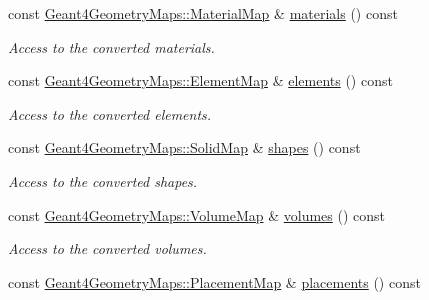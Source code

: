 \begin{DoxyCompactItemize}
\item 
const \hyperlink{namespace_d_d4hep_1_1_simulation_1_1_geant4_geometry_maps_a0ae377c64e684c47bd3045a9d3d8e248}{Geant4\+Geometry\+Maps\+::\+Material\+Map} \& \hyperlink{class_d_d4hep_1_1_simulation_1_1_geant4_detector_construction_sequence_ab22110a855dc4c9956ded5d347782c14}{materials} () const
\begin{DoxyCompactList}\small\item\em Access to the converted materials. \end{DoxyCompactList}\item 
const \hyperlink{namespace_d_d4hep_1_1_simulation_1_1_geant4_geometry_maps_a175b532b796e7de3d9128c1f0e1ee406}{Geant4\+Geometry\+Maps\+::\+Element\+Map} \& \hyperlink{class_d_d4hep_1_1_simulation_1_1_geant4_detector_construction_sequence_aedc109e63a8418c6cfbeab4914f388c2}{elements} () const
\begin{DoxyCompactList}\small\item\em Access to the converted elements. \end{DoxyCompactList}\item 
const \hyperlink{namespace_d_d4hep_1_1_simulation_1_1_geant4_geometry_maps_a5591dbffcd2e6432004034209abd630e}{Geant4\+Geometry\+Maps\+::\+Solid\+Map} \& \hyperlink{class_d_d4hep_1_1_simulation_1_1_geant4_detector_construction_sequence_ab449db11def741eba65c3fbff0a0e176}{shapes} () const
\begin{DoxyCompactList}\small\item\em Access to the converted shapes. \end{DoxyCompactList}\item 
const \hyperlink{namespace_d_d4hep_1_1_simulation_1_1_geant4_geometry_maps_a85199a23e6a837678c8e5d5f902fb2e2}{Geant4\+Geometry\+Maps\+::\+Volume\+Map} \& \hyperlink{class_d_d4hep_1_1_simulation_1_1_geant4_detector_construction_sequence_a1f41cef2a30e863953571552d2093314}{volumes} () const
\begin{DoxyCompactList}\small\item\em Access to the converted volumes. \end{DoxyCompactList}\item 
const \hyperlink{namespace_d_d4hep_1_1_simulation_1_1_geant4_geometry_maps_a587c0a02d3847f03e6427093c90e93d2}{Geant4\+Geometry\+Maps\+::\+Placement\+Map} \& \hyperlink{class_d_d4hep_1_1_simulation_1_1_geant4_detector_construction_sequence_a70efd06bdb4da2f633d756d75b5937d7}{placements} () const

\end{DoxyCompactItemize}
